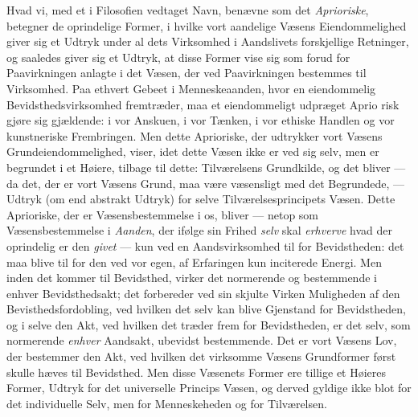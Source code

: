 \documentclass[12pt,a4paper,openany]{book}
\newcommand{\opage}[1]{\marginnote{\footnotesize\textit{[#1]}}}
\begin{document}
Hvad vi, med et i Filosofien vedtaget Navn, benævne
som det \emph{Aprioriske}, betegner de oprindelige Former, i
hvilke vort aandelige Væsens Eiendommelighed giver sig et
Udtryk under al dets Virksomhed i Aandslivets forskjellige
Retninger, og saaledes giver sig et Udtryk, at disse Former
vise sig som forud for Paavirkningen anlagte i det Væsen,
der ved Paavirkningen bestemmes til Virksomhed. Paa ethvert
Gebeet i Menneskeaanden, hvor en eiendommelig Bevidsthedsvirksomhed
fremtræder, maa et eiendommeligt udpræget Aprio%
\opage{53}risk gjøre sig gjældende: i vor Anskuen, i vor Tænken, i
vor ethiske Handlen og vor kunstneriske Frembringen. Men
dette Aprioriske, der udtrykker vort Væsens Grundeiendommelighed,
viser, idet dette Væsen ikke er ved sig selv, men er
begrundet i et Høiere, tilbage til dette: Tilværelsens Grundkilde,
og det bliver --- da det, der er vort Væsens Grund, maa
være væsensligt med det Begrundede, --- Udtryk (om end abstrakt
Udtryk) for selve Tilværelsesprincipets Væsen. Dette
Aprioriske, der er Væsensbestemmelse i os, bliver --- netop som
Væsensbestemmelse i \emph{Aanden}, der ifølge sin Frihed \emph{selv}
skal \emph{erhverve} hvad der oprindelig er den \emph{givet} --- kun ved en
Aandsvirksomhed til for Bevidstheden: det maa blive til for
den ved vor egen, af Erfaringen kun inciterede Energi. Men
inden det kommer til Bevidsthed, virker det normerende og
bestemmende i enhver Bevidsthedsakt; det forbereder ved sin
skjulte Virken Muligheden af den Bevisthedsfordobling, ved
hvilken det selv kan blive Gjenstand for Bevidstheden, og i
selve den Akt, ved hvilken det træder frem for Bevidstheden,
er det selv, som normerende \emph{enhver} Aandsakt, ubevidst bestemmende.
Det er vort Væsens Lov, der bestemmer den
Akt, ved hvilken det virksomme Væsens Grundformer først
skulle hæves til Bevidsthed. Men disse Væsenets Former
ere tillige et Høieres Former, Udtryk for det universelle
Princips Væsen, og derved gyldige ikke blot for det individuelle
Selv, men for Menneskeheden og for Tilværelsen.
\end{document}
